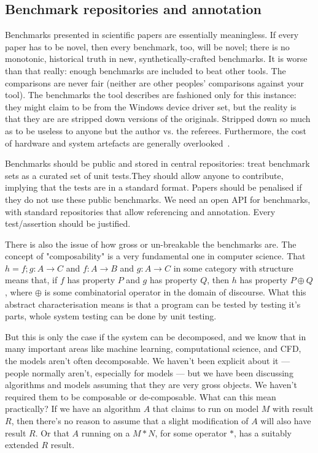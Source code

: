 \documentclass[conference]{IEEEtran}
\begin{document}
\subsection{Benchmark repositories and annotation}

Benchmarks presented in scientific papers are essentially
meaningless. If every paper has to be novel, then every benchmark,
too, will be novel; there is no monotonic, historical truth in new,
synthetically-crafted benchmarks. It is worse than that really: enough
benchmarks are included to beat other tools. The comparisons are never
fair (neither are other peoples' comparisons against your tool).  The
benchmarks the tool describes are fashioned only for this instance:
they might claim to be from the Windows device driver set, but the
reality is that they are are stripped down versions of the
originals. Stripped down so much as to be useless to anyone but the
author vs. the referees. Furthermore, the cost of hardware and system
artefacts are generally overlooked~\cite{brain+devos:2009}.

Benchmarks should be public and stored in central repositories: treat
benchmark sets as a curated set of unit tests.They should allow anyone
to contribute, implying that the tests are in a standard
format. Papers should be penalised if they do not use these public
benchmarks. We need an open API for benchmarks, with standard
repositories that allow referencing and annotation. Every
test/assertion should be justified.

There is also the issue of how gross or un-breakable the benchmarks are. 
The concept of "composability" is a very fundamental one in computer science. 
That $h = f;g : A \rightarrow C$ and $f : A \rightarrow B$ and $g : A \rightarrow C$ 
in some category with structure means that, if $f$ has property $P$ and $g$ has
property $Q$, then $h$ has property $P \oplus Q$, where $\oplus$ is some 
combinatorial operator in the domain of discourse. What this abstract 
characterisation means is that a program can be tested by testing it's parts,
whole system testing can be done by unit testing. 

But this is only the case if the system can be decomposed, and we know that in
many important areas like machine learning, computational science, and CFD,
the models aren't often decomposable.  We haven't been explicit about it ---
people normally aren't, especially for models ---  but we have been discussing
algorithms and models assuming that they are very gross objects. We haven't
required them to be composable or de-composable. What can this mean
practically? If we have an algorithm $A$ that claims to run on model $M$ with
result $R$, then there's no reason to assume that a slight modification of $A$
will also have result $R$. Or that $A$ running on a $M * N$, for some operator
$*$, has a suitably extended $R$ result.
\end{document}
